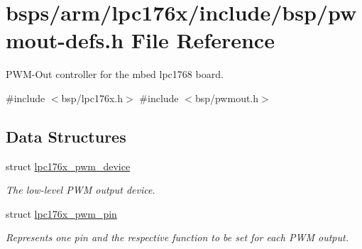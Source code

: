 \hypertarget{pwmout-defs_8h}{}\section{bsps/arm/lpc176x/include/bsp/pwmout-\/defs.h File Reference}
\label{pwmout-defs_8h}


P\+W\+M-\/\+Out controller for the mbed lpc1768 board.  


{\ttfamily \#include $<$bsp/lpc176x.\+h$>$}\newline
{\ttfamily \#include $<$bsp/pwmout.\+h$>$}\newline
\subsection*{Data Structures}
\begin{DoxyCompactItemize}
\item 
struct \mbox{\hyperlink{structlpc176x__pwm__device}{lpc176x\+\_\+pwm\+\_\+device}}
\begin{DoxyCompactList}\small\item\em The low-\/level P\+WM output device. \end{DoxyCompactList}\item 
struct \mbox{\hyperlink{structlpc176x__pwm__pin}{lpc176x\+\_\+pwm\+\_\+pin}}
\begin{DoxyCompactList}\small\item\em Represents one pin and the respective function to be set for each P\+WM output. \end{DoxyCompactList}\end{DoxyCompactItemize}
